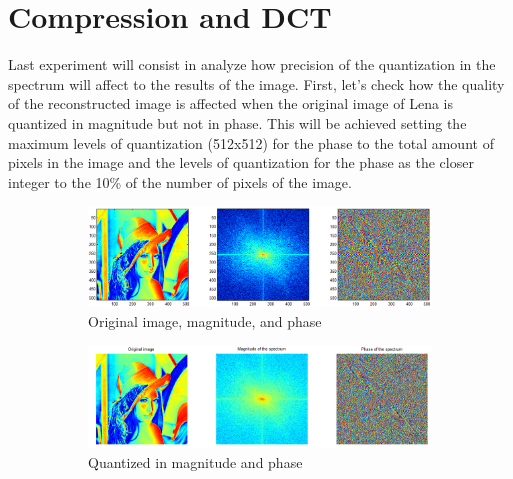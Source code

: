 \documentclass[a4paper, 10pt, conference] {article}
\begin{document}
 \section{Compression and DCT}  
 Last experiment will consist in analyze how precision of the quantization in the spectrum will affect to the results of the image.
 First, let's check how the quality of the reconstructed image is affected when the original image of Lena is quantized in magnitude but not in phase. This will be achieved setting the maximum levels of quantization (512x512) for the phase to the total amount of pixels in the image and the levels of quantization for the phase as the closer integer to the 10\% of the number of pixels of the image.
  \begin{figure}[H]
  	\centering
  	\begin{subfigure}{1\textwidth} 
  		\centering						
  		\includegraphics[scale=0.5]{reportImages/exp3_magnitude01.PNG}
  		\caption{Original image, magnitude, and phase}
  	\end{subfigure}
  	\begin{subfigure}{1\textwidth}
  		\centering
  		\includegraphics[scale=0.5]{reportImages/exp3_magnitude_compressed01.PNG}
  		\caption{Quantized in magnitude and phase}
  	\end{subfigure}
  	\begin{subfigure}{0.32\textwidth}
  		\centering

\end{subfigure}
\end{figure}
\end{document}
